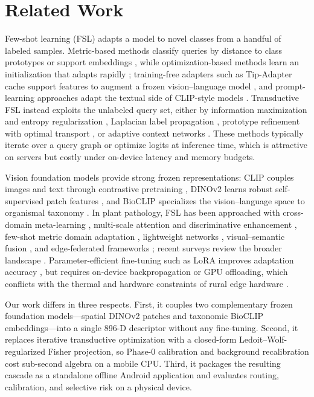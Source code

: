 \documentclass[preprint,12pt]{elsarticle}
\begin{document}
\section{Related Work}
\label{sec:related_work}
Few-shot learning (FSL) adapts a model to novel classes from a handful of labeled samples. Metric-based methods classify queries by distance to class prototypes or support embeddings \cite{snell2017prototypical,wang2019simpleshot}, while optimization-based methods learn an initialization that adapts rapidly \cite{finn2017maml}; training-free adapters such as Tip-Adapter cache support features to augment a frozen vision--language model \cite{zhang2022tip}, and prompt-learning approaches adapt the textual side of CLIP-style models \cite{zhou2022coop}. Transductive FSL instead exploits the unlabeled query set, either by information maximization and entropy regularization \cite{boudiaf2020transductive}, Laplacian label propagation \cite{ziko2020laplacian}, prototype refinement with optimal transport \cite{hu2021leveraging}, or adaptive context networks \cite{bateni2020improved}. These methods typically iterate over a query graph or optimize logits at inference time, which is attractive on servers but costly under on-device latency and memory budgets.

Vision foundation models provide strong frozen representations: CLIP couples images and text through contrastive pretraining \cite{radford2021clip}, DINOv2 learns robust self-supervised patch features \cite{oquab2023dinov2}, and BioCLIP specializes the vision--language space to organismal taxonomy \cite{stevens2024bioclip}. In plant pathology, FSL has been approached with cross-domain meta-learning \cite{yang2024laboratory}, multi-scale attention and discriminative enhancement \cite{zhao2024mafde}, few-shot metric domain adaptation \cite{kudo2025few}, lightweight networks \cite{babu2025agrifewnet}, visual--semantic fusion \cite{zhou2026vsf}, and edge-federated frameworks \cite{sharif2026real}; recent surveys review the broader landscape \cite{mu2024few,radocaj2025evolution}. Parameter-efficient fine-tuning such as LoRA improves adaptation accuracy \cite{hu2022lora}, but requires on-device backpropagation or GPU offloading, which conflicts with the thermal and hardware constraints of rural edge hardware \cite{zhao2026lightweight}.

Our work differs in three respects. First, it couples two complementary frozen foundation models---spatial DINOv2 patches and taxonomic BioCLIP embeddings---into a single 896-D descriptor without any fine-tuning. Second, it replaces iterative transductive optimization with a closed-form Ledoit--Wolf-regularized Fisher projection, so Phase-0 calibration and background recalibration cost sub-second algebra on a mobile CPU. Third, it packages the resulting cascade as a standalone offline Android application and evaluates routing, calibration, and selective risk on a physical device.
\end{document}
